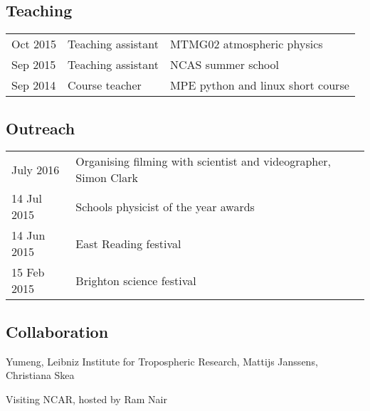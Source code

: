 \documentclass[a4paper,11pt]{article}
\begin{document}
\subsection*{Teaching}
\begin{tabular}{l l l}
Oct 2015 & Teaching assistant & MTMG02 atmospheric physics \\
Sep 2015 & Teaching assistant & NCAS summer school \\
Sep 2014 & Course teacher & MPE python and linux short course \\
\end{tabular}

\subsection*{Outreach}
\begin{tabular}{l l l}
July 2016 & Organising filming with scientist and videographer, Simon Clark \\
14 Jul 2015 & Schools physicist of the year awards \\
14 Jun 2015 & East Reading festival \\
15 Feb 2015 & Brighton science festival \\
\end{tabular}

\subsection*{Collaboration}
Yumeng, Leibniz Institute for Tropospheric Research, Mattijs Janssens, Christiana Skea 

Visiting NCAR, hosted by Ram Nair

                                                 

\end{document}
